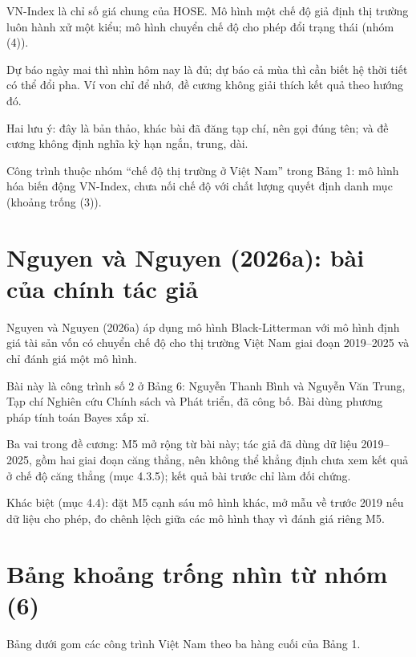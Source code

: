 VN-Index là chỉ số giá chung của HOSE. Mô hình một chế độ giả định thị trường luôn hành xử một kiểu; mô hình chuyển chế độ cho phép đổi trạng thái (nhóm (4)).

Dự báo ngày mai thì nhìn hôm nay là đủ; dự báo cả mùa thì cần biết hệ thời tiết có thể đổi pha. Ví von chỉ để nhớ, đề cương không giải thích kết quả theo hướng đó.

Hai lưu ý: đây là bản thảo, khác bài đã đăng tạp chí, nên gọi đúng tên; và đề cương không định nghĩa kỳ hạn ngắn, trung, dài.

Công trình thuộc nhóm “chế độ thị trường ở Việt Nam” trong Bảng 1: mô hình hóa biến động VN-Index, chưa nối chế độ với chất lượng quyết định danh mục (khoảng trống (3)).

\section{Nguyen và Nguyen (2026a): bài của chính tác giả}

Nguyen và Nguyen (2026a) áp dụng mô hình Black-Litterman với mô hình định giá tài sản vốn có chuyển chế độ cho thị trường Việt Nam giai đoạn 2019--2025 và chỉ đánh giá một mô hình.

Bài này là công trình số 2 ở Bảng 6: Nguyễn Thanh Bình và Nguyễn Văn Trung, Tạp chí Nghiên cứu Chính sách và Phát triển, đã công bố. Bài dùng phương pháp tính toán Bayes xấp xỉ.

Ba vai trong đề cương: M5 mở rộng từ bài này; tác giả đã dùng dữ liệu 2019--2025, gồm hai giai đoạn căng thẳng, nên không thể khẳng định chưa xem kết quả ở chế độ căng thẳng (mục 4.3.5); kết quả bài trước chỉ làm đối chứng.

Khác biệt (mục 4.4): đặt M5 cạnh sáu mô hình khác, mở mẫu về trước 2019 nếu dữ liệu cho phép, đo chênh lệch giữa các mô hình thay vì đánh giá riêng M5.

\section{Bảng khoảng trống nhìn từ nhóm (6)}

Bảng dưới gom các công trình Việt Nam theo ba hàng cuối của Bảng 1.

